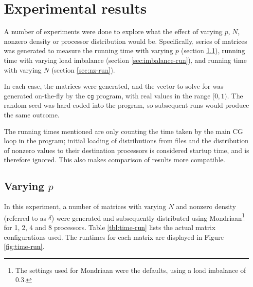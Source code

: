 \documentclass[a4paper]{article}
\begin{document}
\section{Experimental results}

A number of experiments were done to explore what the effect of varying $p$,
$N$, nonzero density or processor distribution would be. Specifically, series
of matrices was generated to measure the running time with varying $p$ (section
\ref{sec:time-run}), running time with varying load imbalance (section
\ref{sec:imbalance-run}), and running time with varying $N$ (section
\ref{sec:nz-run}).

In each case, the matrices were generated, and the vector to solve for
was generated on-the-fly by the \texttt{cg} program, with real values
in the range $[0,1)$. The random seed was hard-coded into the program,
    so subsequent runs would produce the same outcome.

The running times mentioned are only counting the time taken by the main CG loop
in the program; initial loading of distributions from files and the distribution of
nonzero values to their destination processors is considered startup time, and is therefore
ignored. This also makes comparison of results more compatible.

\subsection{Varying $p$}\label{sec:time-run}

In this experiment, a number of matrices with varying $N$ and nonzero density (referred to as $\delta$) were generated and
subsequently distributed using Mondriaan\footnote{The settings used for Mondriaan
were the defaults, using a load imbalance of 0.3.} for 1, 2, 4 and 8 processors. Table \ref{tbl:time-run} lists the actual matrix configurations used. The runtimes for each matrix are displayed in Figure \ref{fig:time-run}.
\end{document}
